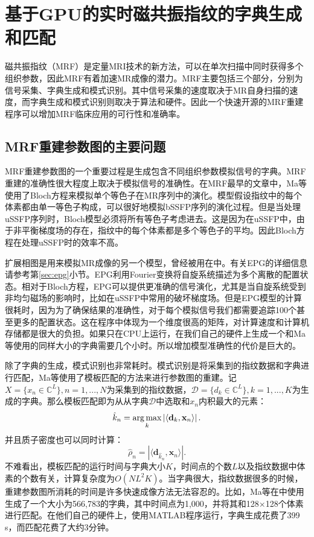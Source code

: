 \chapter{基于GPU的实时磁共振指纹的字典生成和匹配}
\label{chap:snapMRF}
磁共振指纹（MRF）是定量MRI技术的新方法，可以在单次扫描中同时获得多个组织参数\cite{mrf,esr,bipin_mehta_magnetic_2019}，因此MRF有着加速MR成像的潜力。MRF主要包括三个部分，分别为信号采集、字典生成和模式识别。其中信号采集的速度取决于MR自身扫描的速度，而字典生成和模式识别则取决于算法和硬件。因此一个快速开源的MRF重建程序可以增加MRF临床应用的可行性和准确率。

\section{MRF重建参数图的主要问题}
MRF重建参数图的一个重要过程是生成包含不同组织参数模拟信号的字典。MRF重建的准确性很大程度上取决于模拟信号的准确性。在MRF最早的文章中，Ma等\cite{mrf}使用了Bloch方程来模拟单个等色子在MR序列中的演化。模型假设指纹中的每个体素都由单一等色子构成，可以很好地模拟bSSFP序列的演化过程。但是当处理uSSFP序列时，Bloch模型必须将所有等色子考虑进去。这是因为在uSSFP中，由于非平衡梯度场的存在，指纹中的每个体素都是多个等色子的平均。因此Bloch方程在处理uSSFP时的效率不高。

扩展相图是用来模拟MR成像的另一个模型，曾经被用在\cite{jiang}中。有关EPG的详细信息请参考第\ref{sec:epg}小节。EPG利用Fourier变换将自旋系统描述为多个离散的配置状态。相对于Bloch方程，EPG可以提供更准确的信号演化，尤其是当自旋系统受到非均匀磁场的影响时，比如在uSSFP中常用的破坏梯度场。但是EPG模型的计算很耗时，因为为了确保结果的准确性，对于每个模拟信号我们都需要追踪100个甚至更多的配置状态。这在程序中体现为一个维度很高的矩阵，对计算速度和计算机存储都是很大的负担。如果只在CPU上运行，在我们自己的硬件上生成一个和Ma等\cite{mrf}使用的同样大小的字典需要几个小时。所以增加模型准确性的代价是巨大的。

除了字典的生成，模式识别也非常耗时。模式识别是将采集到的指纹数据和字典进行匹配，Ma等\cite{mrf}使用了模板匹配的方法来进行参数图的重建。记$X=\{x_n\in \mathbb{C}^L\}, n=1,...,N$为采集到的指纹数据，$\mathcal{D}=\{d_k\in \mathbb{C}^L\},k=1,...,K$为生成的字典。那么模板匹配即为从从字典$\mathcal{D}$中选取和$x_n$内积最大的元素：
	\begin{equation}
	\hat{k}_n = \operatorname*{arg\,max}_k \left|\left\langle \mathbf{d}_k,\mathbf{x}_n \right\rangle \right|.
	\end{equation}
并且质子密度也可以同时计算：
	\begin{equation}
	\hat{\rho}_n=\left|\langle \mathbf{d}_{\hat{k}_n},\mathbf{x}_n \rangle\right|.
	\end{equation}
不难看出，模板匹配的运行时间与字典大小$K$，时间点的个数$L$以及指纹数据中体素的个数有关，计算复杂度为$O(NL^2K)$。当字典很大，指纹数据很多的时候，重建参数图所消耗的时间是许多快速成像方法无法容忍的。比如，Ma等在\cite{mrf}中使用生成了一个大小为566,783的字典，其中时间点为1,000，并将其和128$\times$128个体素进行匹配。在他们自己的硬件上，使用MATLAB程序运行，字典生成花费了399 s，而匹配花费了大约3分钟。


